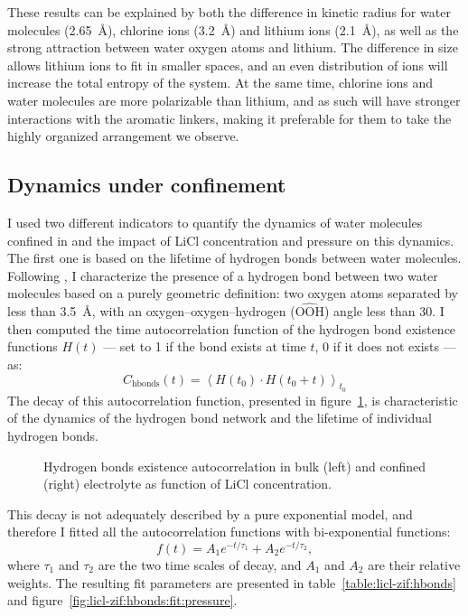 \documentclass[thesis]{subfiles}
\begin{document}
These results can be explained by both the difference in kinetic
radius\cite{Marcus1988} for water molecules (\SI{2.65}{\AA}), chlorine
ions (\SI{3.2}{\AA}) and lithium ions (\SI{2.1}{\AA}), as well as
the strong attraction between water oxygen atoms and lithium. The difference in
size allows lithium ions to fit in smaller spaces, and an even distribution of
ions will increase the total entropy of the system. At the same time, chlorine
ions and water molecules are more polarizable than lithium, and as such will
have stronger interactions with the aromatic linkers, making it preferable for
them to take the highly organized arrangement we observe.

\FloatBarrier
\subsection{Dynamics under confinement}

I used two different indicators to quantify the dynamics of water molecules
confined in  and the impact of LiCl concentration and pressure on this
dynamics. The first one is based on the lifetime of hydrogen bonds between water
molecules. Following \citeauthor{Luzar1996}\cite{Luzar1996}, I characterize the
presence of a hydrogen bond between two water molecules based on a purely
geometric definition: two oxygen atoms separated by less than \SI{3.5}{\AA},
with an oxygen--oxygen--hydrogen ($\widehat{\text{OOH}}$) angle less than
30\textdegree. I then computed the time autocorrelation function of the hydrogen
bond existence functions $H(t)$ --- set to 1 if the bond exists at time $t$, 0
if it does not exists --- as:
\[C_{\text{hbonds}}(t) = \left\langle H(t_0) \cdot H(t_0 + t) \right\rangle_{t_0} \]
The decay of this autocorrelation function, presented in
figure~\ref{fig:licl-zif:hbonds}, is characteristic of the dynamics of the
hydrogen bond network and the lifetime of individual hydrogen bonds.

\begin{figure}[ht]
    \centering
    
    \caption{Hydrogen bonds existence autocorrelation in bulk (left) and
    confined (right) electrolyte as function of LiCl concentration.}
    \label{fig:licl-zif:hbonds}
\end{figure}

This decay is not adequately described by a pure exponential model, and
therefore I fitted all the autocorrelation functions with bi-exponential
functions:
\[ f(t) = A_1 e^{-t / \tau_1} + A_2 e^{-t / \tau_2}, \]
where $\tau_1$ and $\tau_2$ are the two time scales of decay, and $A_1$ and
$A_2$ are their relative weights. The resulting fit parameters are presented in
table~\ref{table:licl-zif:hbonds} and figure~\ref{fig:licl-zif:hbonds:fit:pressure}.
\end{document}
